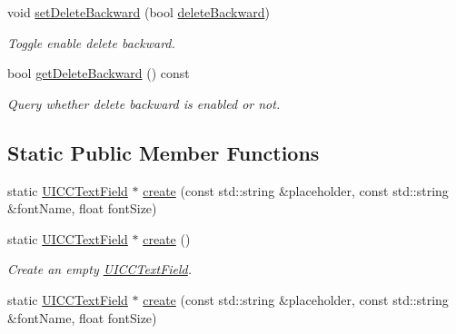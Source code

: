 \begin{DoxyCompactItemize}
void \hyperlink{classui_1_1UICCTextField_a023e1be2c42fac0ee7a1997885b5763d}{set\+Delete\+Backward} (bool \hyperlink{classui_1_1UICCTextField_ac7b7cc8ebdb6ffa1f9c480a8e9173a4c}{delete\+Backward})
\begin{DoxyCompactList}\small\item\em Toggle enable delete backward. \end{DoxyCompactList}\item 
bool \hyperlink{classui_1_1UICCTextField_a1fa647f6e2272f11dfb6d1a5bb1e2b7c}{get\+Delete\+Backward} () const
\begin{DoxyCompactList}\small\item\em Query whether delete backward is enabled or not. \end{DoxyCompactList}\end{DoxyCompactItemize}
\subsection*{Static Public Member Functions}
\begin{DoxyCompactItemize}
\item 
static \hyperlink{classui_1_1UICCTextField}{U\+I\+C\+C\+Text\+Field} $\ast$ \hyperlink{classui_1_1UICCTextField_ad5085f0016d635073428cd7d7ccb7e96}{create} (const std\+::string \&placeholder, const std\+::string \&font\+Name, float font\+Size)
\item 
static \hyperlink{classui_1_1UICCTextField}{U\+I\+C\+C\+Text\+Field} $\ast$ \hyperlink{classui_1_1UICCTextField_aecd9061fd41859b74fa71c3c4730ee82}{create} ()
\begin{DoxyCompactList}\small\item\em Create an empty \hyperlink{classui_1_1UICCTextField}{U\+I\+C\+C\+Text\+Field}. \end{DoxyCompactList}\item 
static \hyperlink{classui_1_1UICCTextField}{U\+I\+C\+C\+Text\+Field} $\ast$ \hyperlink{classui_1_1UICCTextField_a7bb433282dda5320b2df5c13da7ed142}{create} (const std\+::string \&placeholder, const std\+::string \&font\+Name, float font\+Size)
\end{DoxyCompactItemize}
